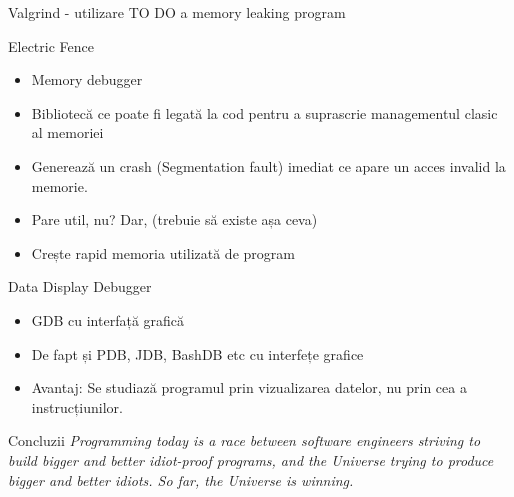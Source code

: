 \documentclass{beamer}
\begin{document}
\begin{frame}{Valgrind - utilizare}
TO DO a memory leaking program
\end{frame}

\begin{frame}{Electric Fence}
\begin{itemize}
\item Memory debugger
\item Bibliotecă ce poate fi legată la cod pentru a suprascrie managementul clasic al memoriei
\item Generează un crash (Segmentation fault) imediat ce apare un acces invalid la memorie.
\item \pause Pare util, nu? \pause Dar, (trebuie să existe așa ceva)
\item \pause Crește rapid memoria utilizată de program
\end{itemize}
\end{frame}

\begin{frame}{Data Display Debugger}
\begin{itemize}
\item GDB cu interfață grafică
\item \pause De fapt și PDB, JDB, BashDB etc cu interfețe grafice
\item \pause Avantaj: \pause Se studiază programul prin vizualizarea datelor, nu prin cea a instrucțiunilor.
\end{itemize}
\end{frame}

\begin{frame}{Concluzii}
\textit{Programming today is a race between software engineers striving to build bigger and better idiot-proof programs, and the Universe trying to produce bigger and better idiots. So far, the Universe is winning.}
\end{frame}
\end{document}
